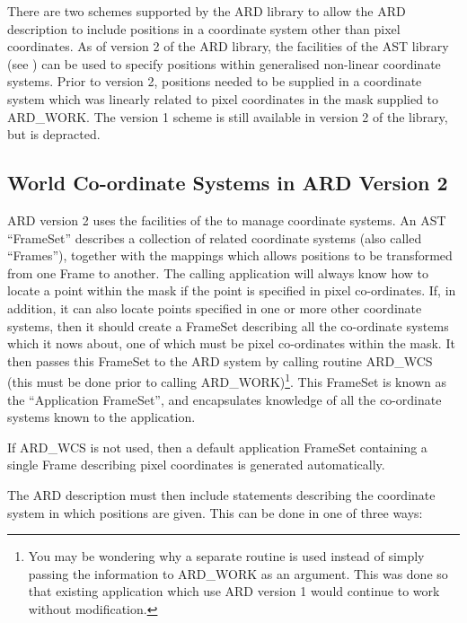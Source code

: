 There are two schemes supported by the ARD library to allow the ARD 
description to include positions in a coordinate system other than pixel 
coordinates. As of version 2 of the ARD library, the facilities of the
AST library (see ) can be used to specify
positions within generalised non-linear coordinate systems. Prior to 
version 2, positions needed to be supplied in a coordinate system which
was linearly related to pixel coordinates in the mask supplied to
ARD\_WORK. The version 1 scheme is still available in version 2 of the
library, but is depracted.

\subsection{World Co-ordinate Systems in ARD Version 2}

ARD version 2 uses the facilities of the  to
manage coordinate systems. An AST ``FrameSet'' describes a collection of
related coordinate systems (also called ``Frames''), together with the
mappings which allows positions to be transformed from one Frame to
another. The calling application will always know how to locate a point
within the mask if the point is specified in pixel co-ordinates. If, in
addition, it can also locate points specified in one or more other
coordinate systems, then it should create a FrameSet describing all the
co-ordinate systems which it nows about, one of which must be pixel
co-ordinates within the mask. It then passes this
FrameSet to the ARD system by calling routine ARD\_WCS (this must be done
prior to calling ARD\_WORK)\footnote{You may be wondering why a separate
routine is used instead of simply passing the information to ARD\_WORK as
an argument. This was done so that existing application which use ARD
version 1 would continue to work without modification.}. This FrameSet is
known as the ``Application FrameSet'', and encapsulates knowledge of all
the co-ordinate systems known to the application. 

If ARD\_WCS is not used, then a default application FrameSet containing a
single Frame describing pixel coordinates is generated automatically.

The ARD description must then include statements describing the 
coordinate system in which positions are given. This can be done in one
of three ways:

